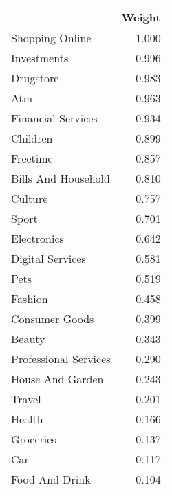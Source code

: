\begin{tabular}{lr}
\toprule
{} &  Weight \\
\midrule
Shopping Online       &   1.000 \\
Investments           &   0.996 \\
Drugstore             &   0.983 \\
Atm                   &   0.963 \\
Financial Services    &   0.934 \\
Children              &   0.899 \\
Freetime              &   0.857 \\
Bills And Household   &   0.810 \\
Culture               &   0.757 \\
Sport                 &   0.701 \\
Electronics           &   0.642 \\
Digital Services      &   0.581 \\
Pets                  &   0.519 \\
Fashion               &   0.458 \\
Consumer Goods        &   0.399 \\
Beauty                &   0.343 \\
Professional Services &   0.290 \\
House And Garden      &   0.243 \\
Travel                &   0.201 \\
Health                &   0.166 \\
Groceries             &   0.137 \\
Car                   &   0.117 \\
Food And Drink        &   0.104 \\
\bottomrule
\end{tabular}
